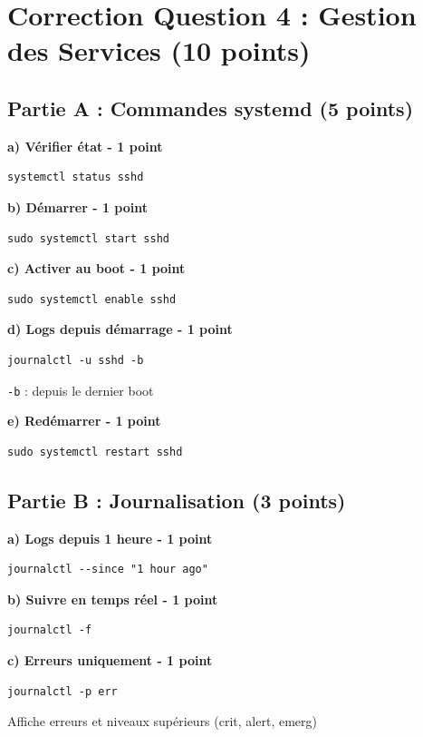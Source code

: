 \documentclass[12pt,a4paper]{article}
\begin{document}
\section{Correction Question 4 : Gestion des Services (10 points)}

\subsection*{Partie A : Commandes systemd (5 points)}

\begin{answerbox}
\textbf{a) Vérifier état - 1 point}
\begin{lstlisting}
systemctl status sshd
\end{lstlisting}

\textbf{b) Démarrer - 1 point}
\begin{lstlisting}
sudo systemctl start sshd
\end{lstlisting}

\textbf{c) Activer au boot - 1 point}
\begin{lstlisting}
sudo systemctl enable sshd
\end{lstlisting}

\textbf{d) Logs depuis démarrage - 1 point}
\begin{lstlisting}
journalctl -u sshd -b
\end{lstlisting}
\texttt{-b} : depuis le dernier boot

\textbf{e) Redémarrer - 1 point}
\begin{lstlisting}
sudo systemctl restart sshd
\end{lstlisting}
\end{answerbox}

\subsection*{Partie B : Journalisation (3 points)}

\begin{answerbox}
\textbf{a) Logs depuis 1 heure - 1 point}
\begin{lstlisting}
journalctl --since "1 hour ago"
\end{lstlisting}

\textbf{b) Suivre en temps réel - 1 point}
\begin{lstlisting}
journalctl -f
\end{lstlisting}

\textbf{c) Erreurs uniquement - 1 point}
\begin{lstlisting}
journalctl -p err
\end{lstlisting}
Affiche erreurs et niveaux supérieurs (crit, alert, emerg)
\end{answerbox}
\end{document}
